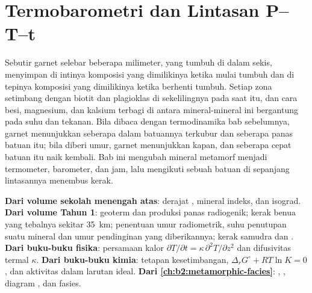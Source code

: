\chapter{Termobarometri dan Lintasan P--T--t}\label{ch:b2:pt-paths}

Sebutir garnet selebar beberapa milimeter, yang tumbuh di dalam sekis, menyimpan di intinya komposisi
yang dimilikinya ketika mulai tumbuh dan di tepinya komposisi yang dimilikinya ketika berhenti tumbuh. Setiap
zona setimbang dengan biotit dan plagioklas di sekelilingnya pada saat itu, dan
cara besi, magnesium, dan kalsium terbagi di antara mineral-mineral ini bergantung pada suhu
dan tekanan. Bila dibaca dengan termodinamika bab sebelumnya, garnet menunjukkan seberapa
dalam batuannya terkubur dan seberapa panas batuan itu; bila diberi umur, garnet menunjukkan kapan, dan seberapa cepat
batuan itu naik kembali. Bab ini mengubah mineral metamorf menjadi termometer, barometer,
dan jam, lalu mengikuti sebuah batuan di sepanjang lintasannya menembus kerak.

\begin{recall}
\textbf{Dari volume sekolah menengah atas}: derajat , mineral indeks, dan isograd.
\textbf{Dari volume Tahun 1}: geoterm dan produksi panas radiogenik; kerak
benua yang tebalnya sekitar \qty{35}{km}; penentuan umur radiometrik, suhu penutupan
suatu mineral dan umur pendinginan yang diberikannya; kerak samudra dan .
\textbf{Dari buku-buku fisika}: persamaan kalor $\partial T/\partial t = \kappa\,
\partial^2 T/\partial z^2$ dan difusivitas termal $\kappa$. \textbf{Dari buku-buku
kimia}: tetapan kesetimbangan, $\Delta_r G^\circ + RT\ln K = 0$, dan aktivitas dalam
larutan ideal. \textbf{Dari \cref{ch:b2:metamorphic-facies}}: ,
, diagram , dan fasies.
\end{recall}

